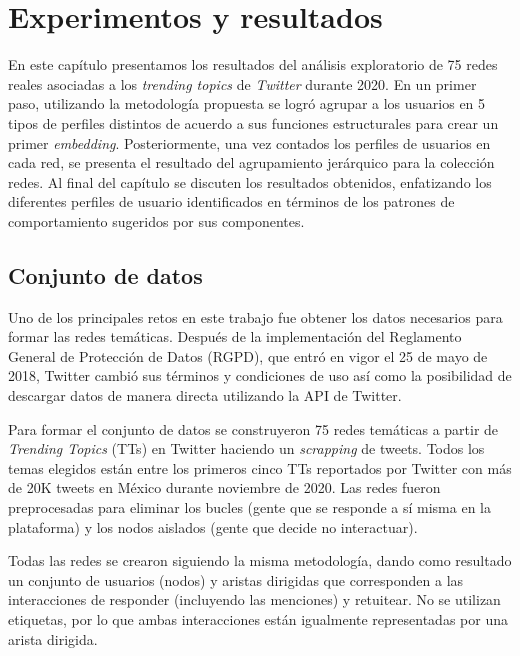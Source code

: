 
\chapter{Experimentos y resultados}
\label{sec:experiments}


En este capítulo presentamos los resultados del análisis exploratorio de 75 redes reales asociadas a los \textit{trending topics} de \textit{Twitter} durante 2020. En un primer paso, utilizando la metodología propuesta se logró agrupar a los usuarios en 5 tipos de perfiles distintos de acuerdo a sus funciones estructurales para crear un primer \textit{embedding}. Posteriormente, una vez contados los perfiles de usuarios en cada red, se presenta el resultado del agrupamiento jerárquico para la colección redes. Al final del capítulo se discuten los resultados obtenidos, enfatizando los diferentes perfiles de usuario identificados en términos de los patrones de comportamiento sugeridos por sus componentes.

\section{Conjunto de datos}

Uno de los principales retos en este trabajo fue obtener los datos necesarios para formar las redes temáticas. Después de la implementación del Reglamento General de Protección de Datos (RGPD), que entró en vigor el 25 de mayo de 2018, Twitter cambió sus términos y condiciones de uso así como la posibilidad de descargar datos de manera directa utilizando la API de Twitter.

Para formar el conjunto de datos se construyeron 75 redes temáticas a partir de \textit{Trending Topics} (TTs) en Twitter haciendo un \textit{scrapping} de tweets. Todos los temas elegidos están entre los primeros cinco TTs reportados por Twitter con más de 20K tweets en México durante noviembre de 2020. Las redes fueron preprocesadas para eliminar los bucles (gente que se responde a sí misma en la plataforma) y los nodos aislados (gente que decide no interactuar).

Todas las redes se crearon siguiendo la misma metodología, dando como resultado un conjunto de usuarios (nodos) y aristas dirigidas que corresponden a las interacciones de responder (incluyendo las menciones) y retuitear. No se utilizan etiquetas, por lo que ambas interacciones están igualmente representadas por una arista dirigida. 

